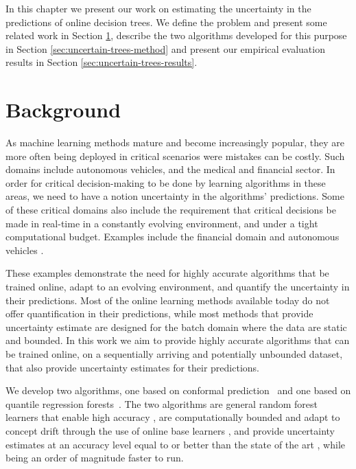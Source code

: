 In this chapter we present our work on estimating the uncertainty
in the predictions of online decision trees. We define the problem
and present some related work in Section \ref{sec:uncertain-trees-background},
describe the two algorithms developed for this purpose in Section
\ref{sec:uncertain-trees-method} and present our empirical evaluation
results in Section \ref{sec:uncertain-trees-results}.

\section{Background}
\label{sec:uncertain-trees-background}

As machine learning methods mature and become increasingly popular, they are more
often being deployed in critical scenarios were mistakes can be costly. Such
domains include autonomous vehicles, and the medical and financial sector.
In order for critical decision-making to be done by learning algorithms in these areas, we need
to have a notion uncertainty in the algorithms' predictions.
Some of these critical domains also include the requirement that critical decisions
be made in real-time in a constantly evolving environment, and under a tight computational budget. Examples include the financial domain \cite{streaming-finance} and autonomous vehicles \cite{av-safety}.

These examples demonstrate the need for highly accurate algorithms that be trained
online, adapt to an evolving environment, and quantify the uncertainty in their
predictions. Most of the online learning methods available today do not offer
quantification in their predictions, while most methods that provide uncertainty
estimate are designed for the batch domain where the data are static and bounded.
In this work we aim to provide highly accurate algorithms that can be trained
online, on a sequentially arriving and potentially unbounded dataset, that also
provide uncertainty estimates for their predictions.

We develop two algorithms, one based on conformal prediction~\cite{vovk2005algorithmic} and one based on quantile
regression forests~\cite{meinshausen2006quantile}. The two algorithms are general random forest learners that
enable high accuracy \cite{hundreds-classifiers}, are computationally bounded
and adapt to concept drift through the use of online base learners \cite{fimt},
and provide uncertainty estimates at an accuracy level equal to or better
than the state of the art \cite{mondrian-forests-original}, while being an order of magnitude faster to run.

